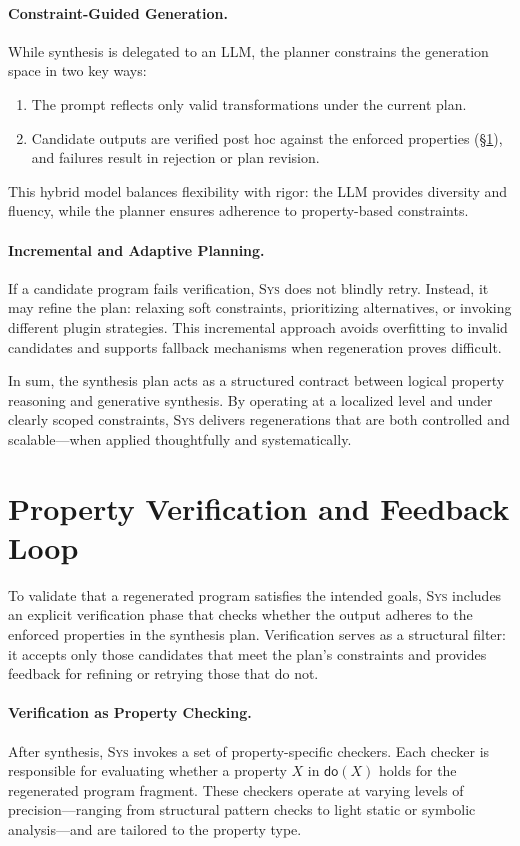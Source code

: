 \documentclass[sigplan]{acmart}
\newcommand{\sys}{{\scshape Sys}\xspace}
\begin{document}
\paragraph{Constraint-Guided Generation.}
While synthesis is delegated to an LLM, the planner constrains the generation space in two key ways:
\begin{enumerate}
  \item The prompt reflects only valid transformations under the current plan.
  \item Candidate outputs are verified post hoc against the enforced properties (§\ref{sec:verification}), and failures result in rejection or plan revision.
\end{enumerate}
This hybrid model balances flexibility with rigor: the LLM provides diversity and fluency, while the planner ensures adherence to property-based constraints.

\paragraph{Incremental and Adaptive Planning.}
If a candidate program fails verification, \sys does not blindly retry. Instead, it may refine the plan: relaxing soft constraints, prioritizing alternatives, or invoking different plugin strategies. This incremental approach avoids overfitting to invalid candidates and supports fallback mechanisms when regeneration proves difficult.

In sum, the synthesis plan acts as a structured contract between logical property reasoning and generative synthesis. By operating at a localized level and under clearly scoped constraints, \sys delivers regenerations that are both controlled and scalable—when applied thoughtfully and systematically.

\section{Property Verification and Feedback Loop}
\label{sec:verification}

To validate that a regenerated program satisfies the intended goals, \sys includes an explicit verification phase that checks whether the output adheres to the enforced properties in the synthesis plan. Verification serves as a structural filter: it accepts only those candidates that meet the plan’s constraints and provides feedback for refining or retrying those that do not.

\paragraph{Verification as Property Checking.}
After synthesis, \sys invokes a set of property-specific checkers. Each checker is responsible for evaluating whether a property $X$ in $\mathsf{do}(X)$ holds for the regenerated program fragment. These checkers operate at varying levels of precision—ranging from structural pattern checks to light static or symbolic analysis—and are tailored to the property type.
\end{document}
